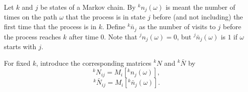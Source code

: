 Let $k$ and $j$ be states of a Markov chain. By ${}^k n_j(\omega)$ is meant the number of times on the path $\omega$ that the process is in state $j$ before (and not including) the first time that the process is in $k$. Define ${}^k \bar{n}_j$ as the number of visits to $j$ before the process reaches $k$ after time $0$. Note that ${}^j n_j(\omega) = 0$, but ${}^j \bar{n}_j(\omega)$ is $1$ if $\omega$ starts with $j$.

For fixed $k$, introduce the corresponding matrices ${}^k N$ and ${}^k \bar{N}$ by
$${}^k N_{ij} = M_i[{}^k n_j(\omega)],$$
$${}^k \bar{N}_{ij} = M_i[{}^k \bar{n}_j(\omega)].$$
